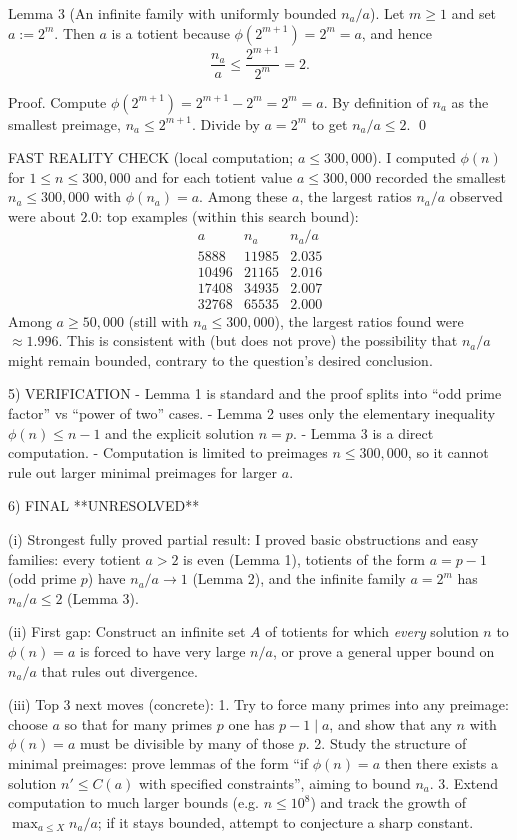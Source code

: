 Lemma 3 (An infinite family with uniformly bounded $n_a/a$).
Let $m\ge 1$ and set $a:=2^m$. Then $a$ is a totient because $\phi(2^{m+1})=2^m=a$, and hence
\[\frac{n_a}{a}\le \frac{2^{m+1}}{2^m}=2.\]

Proof.
Compute $\phi(2^{m+1})=2^{m+1}-2^m=2^m=a$. By definition of $n_a$ as the smallest preimage, $n_a\le 2^{m+1}$.
Divide by $a=2^m$ to get $n_a/a\le 2$. \qed

FAST REALITY CHECK (local computation; $a\le 300{,}000$).
I computed $\phi(n)$ for $1\le n\le 300{,}000$ and for each totient value $a\le 300{,}000$ recorded the smallest $n_a\le 300{,}000$ with $\phi(n_a)=a$.
Among these $a$, the largest ratios $n_a/a$ observed were about $2.0$:
top examples (within this search bound):
\[
\begin{array}{c|c|c}
a & n_a & n_a/a\\\hline
5888 & 11985 & 2.035\\
10496 & 21165 & 2.016\\
17408 & 34935 & 2.007\\
32768 & 65535 & 2.000
\end{array}
\]
Among $a\ge 50{,}000$ (still with $n_a\le 300{,}000$), the largest ratios found were $\approx 1.996$.
This is consistent with (but does not prove) the possibility that $n_a/a$ might remain bounded, contrary to the question's desired conclusion.

5) VERIFICATION
- Lemma 1 is standard and the proof splits into ``odd prime factor'' vs ``power of two'' cases.
- Lemma 2 uses only the elementary inequality $\phi(n)\le n-1$ and the explicit solution $n=p$.
- Lemma 3 is a direct computation.
- Computation is limited to preimages $n\le 300{,}000$, so it cannot rule out larger minimal preimages for larger $a$.

6) FINAL
**UNRESOLVED**

(i) Strongest fully proved partial result:
I proved basic obstructions and easy families:
every totient $a>2$ is even (Lemma 1),
totients of the form $a=p-1$ (odd prime $p$) have $n_a/a\to 1$ (Lemma 2),
and the infinite family $a=2^m$ has $n_a/a\le 2$ (Lemma 3).

(ii) First gap:
Construct an infinite set $A$ of totients for which \emph{every} solution $n$ to $\phi(n)=a$ is forced to have very large $n/a$,
or prove a general upper bound on $n_a/a$ that rules out divergence.

(iii) Top 3 next moves (concrete):
1. Try to force many primes into any preimage: choose $a$ so that for many primes $p$ one has $p-1\mid a$, and show that any $n$ with $\phi(n)=a$ must be divisible by many of those $p$.
2. Study the structure of minimal preimages: prove lemmas of the form ``if $\phi(n)=a$ then there exists a solution $n'\le C(a)$ with specified constraints'', aiming to bound $n_a$.
3. Extend computation to much larger bounds (e.g. $n\le 10^8$) and track the growth of $\max_{a\le X} n_a/a$; if it stays bounded, attempt to conjecture a sharp constant.

